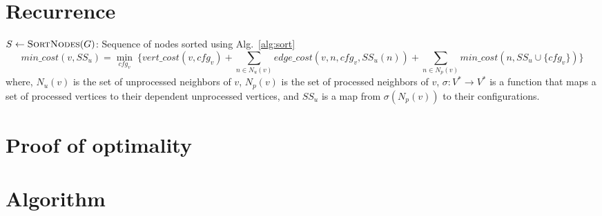 \documentclass{article}
\newcommand{\set}[1]{\{#1\}}
\begin{document}
\section{Recurrence}
$S\gets \textsc{SortNodes}(G)$: Sequence of nodes sorted using Alg.~\ref{alg:sort}
$$
min\_cost(v, SS_u) = \min_{cfg_v}~\{vert\_cost(v, cfg_v) + \sum_{n \in N_u(v)} edge\_cost(v,
n, cfg_v, SS_u(n)) + \sum_{n \in N_p(v)} min\_cost(n, SS_u\cup
\set{cfg_v})\} $$
where, $N_u(v)$ is the set of unprocessed neighbors of $v$, $N_p(v)$ is the set
of processed neighbors of $v$, $\sigma:V^*\rightarrow V^*$ is a function
that maps a set of processed vertices to their dependent unprocessed vertices,
and $SS_u$ is a map from $\sigma(N_p(v))$ to their configurations.


\section{Proof of optimality}


\section{Algorithm}
\end{document}
